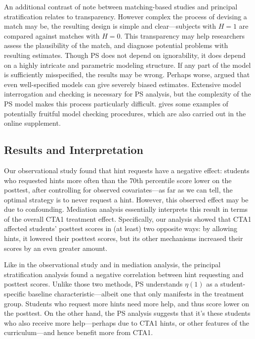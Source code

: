 \documentclass{article}\usepackage[]{graphicx}\usepackage[]{color}
\begin{document}
An additional contrast of note between matching-based studies and
principal stratification relates to transparency.
However complex the process of devising a match may be, the resulting
design is simple and clear---subjects with $H=1$ are compared against
matches with $H=0$.
This transparency may help researchers assess the plausibility of the
match, and diagnose potential problems with resulting estimates.
Though PS does not depend on ignorability, it does depend on a highly
intricate and parametric modeling structure.
If any part of the model is sufficiently misspecified, the results may
be wrong.
Perhaps worse, \citet{feller2016principal} argued that even well-specified
models can give severely biased estimates.
Extensive model interrogation and checking is necessary for PS
analysis, but the complexity of the PS model makes this process
particularly difficult.
\citet{aoas} gives some examples of potentially fruitful model
checking procedures, which are also carried out in the online supplement.

\subsection{Results and Interpretation}

Our observational study found that hint requests have a negative effect: students who
requested hints more often than the 70th
percentile score lower on the posttest, after controlling for observed covariates---as
far as we can tell, the optimal strategy is to never request a hint.
However, this observed effect may be due to confounding.
Mediation analysis essentially interprets this result in terms of the
overall CTA1 treatment effect.
Specifically, our analysis showed that CTA1 affected students'
posttest scores in (at least) two opposite ways: by allowing hints, it
lowered their posttest scores, but its other mechanisms increased
their scores by an even greater amount.

Like in the observational study and in mediation analysis, the
principal stratification analysis found a negative correlation
between hint requesting and posttest scores.
Unlike those two methods, PS understands $\eta(1)$ as a
student-specific baseline characteristic---albeit one that only
manifests in the treatment group.
Students who request more hints need more help, and thus score lower
on the posttest.
On the other hand, the PS analysis suggests that it's these students
who also receive more help---perhaps due to CTA1 hints, or other
features of the curriculum---and hence benefit more from CTA1.
\end{document}
